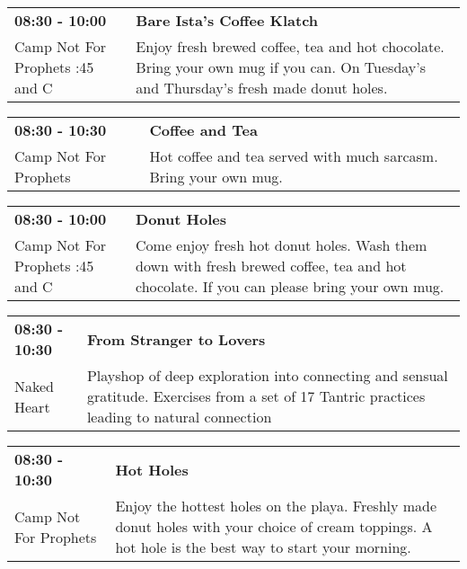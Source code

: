 \begin{tabular}{ p{1in} p{2.2in} }
    \textbf{08:30 - 10:00} & \textbf{Bare Ista's Coffee Klatch } \\
    Camp Not For Prophets \newline 2:45 and C & Enjoy fresh brewed coffee, tea and hot chocolate. Bring your own mug if you can. On Tuesday's and Thursday's fresh made donut holes. \\
    \hline 
\end{tabular}
    
\begin{tabular}{ p{1in} p{2.2in} }
    \textbf{08:30 - 10:30} & \textbf{Coffee and Tea} \\
    Camp Not For Prophets \newline  & Hot coffee and tea served with much sarcasm.  Bring your own mug. \\
    \hline 
\end{tabular}
    
\begin{tabular}{ p{1in} p{2.2in} }
    \textbf{08:30 - 10:00} & \textbf{Donut Holes} \\
    Camp Not For Prophets \newline 2:45 and C & Come enjoy fresh hot donut holes. Wash them down with fresh brewed coffee, tea and hot chocolate. If you can please bring your own mug. \\
    \hline 
\end{tabular}
    
\begin{tabular}{ p{1in} p{2.2in} }
    \textbf{08:30 - 10:30} & \textbf{From Stranger to Lovers } \\
    Naked Heart \newline  & Playshop of deep exploration into connecting and sensual gratitude. Exercises from a set of 17 Tantric practices leading to natural connection \\
    \hline 
\end{tabular}
    
\begin{tabular}{ p{1in} p{2.2in} }
    \textbf{08:30 - 10:30} & \textbf{Hot Holes} \\
    Camp Not For Prophets \newline  & Enjoy the hottest holes on the playa. Freshly made donut holes with your choice of cream toppings.  A hot hole is the best way to start your morning. \\
    \hline 
\end{tabular}
    
